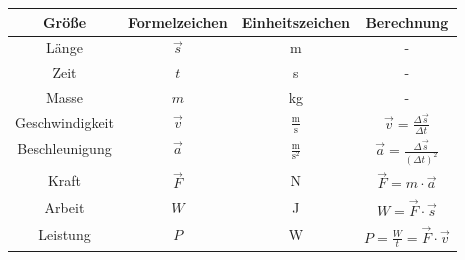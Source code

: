 \begin{table}[hbt]	
	\centering
	\renewcommand{\arraystretch}{1.5}	%
	\label{tab:physikalGroessen}
	\begin{tabular}{c|ccc}
		\parbox[t]{0.17\linewidth}{\centering Größe} & \parbox[t]{0.17\linewidth}{\centering Formelzeichen} & \parbox[t]{0.17\linewidth}{\centering Einheitszeichen}  & \parbox[t]{0.17\linewidth}{\centering Berechnung} \\ 
		\hline 
		\hline
		Länge & $ \vec{s} $ & m & - \\
		Zeit & $ t $  & s & - \\
		Masse & $ m $ & kg & - \\
		Geschwindigkeit & $ \vec{v} $ &  $ \frac{\mathrm{m}}{\mathrm{s}} $ & $ \vec{v} = \frac{\Delta \vec{s}}{\Delta t} $ \\
		Beschleunigung & $ \vec{a} $ & $ \frac{\mathrm{m}}{\mathrm{s}^{2}} $ & $ \vec{a} = \frac{\Delta \vec{s}}{(\Delta t)^{2}} $ \\
		Kraft & $ \vec{F} $ & N & $ \vec{F} = m \cdot \vec{a} $ \\
		Arbeit & $ W $ & J & $ W = \vec{F} \cdot \vec{s} $ \\
		Leistung & $ P $ & W & $ P = \frac{W}{t} = \vec{F} \cdot \vec{v} $ \\
	\end{tabular} 
\end{table}
